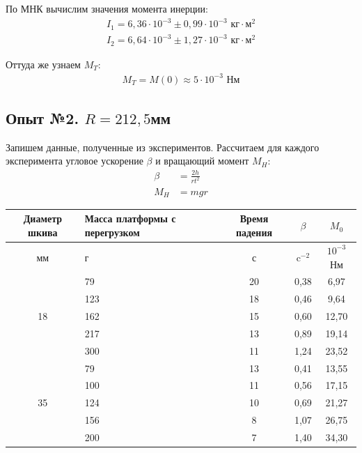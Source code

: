 \documentclass[a4paper, 12pt]{article}
\begin{document}
По МНК вычислим значения момента инерции:
\begin{align*}
I_1 = 6,36 \cdot 10^{-3} \pm 0,99 \cdot 10^{-3} \text{ кг$\cdot$м$^2$} \\
I_2 = 6,64 \cdot 10^{-3} \pm 1,27 \cdot 10^{-3} \text{ кг$\cdot$м$^2$}
\end{align*}

Оттуда же узнаем $M_T$:
\begin{align*}
M_T = M(0) \approx 5 \cdot 10^{-3} \text{ Нм}
\end{align*}

\subsection{Опыт №2. $R = 212,5$мм}

Запишем данные, полученные из экспериментов.
Рассчитаем для каждого эксперимента угловое ускорение $\beta$ и вращающий момент $M_H$:
\begin{align*}
\beta &= \frac{2h}{rt^2} \\
M_H &= mgr
\end{align*}

\begin{center}
\begin{tabular}{|c|p{4cm}|c|c|c|}
\hline
Диаметр шкива & Масса платформы с перегрузком & Время падения & $\beta$  & $M_0$       \\ \hline
мм            & г                             & с             & c$^{-2}$ & $10^{-3}$Нм \\ \hline
              & 79                            & 20            & 0,38     & 6,97        \\ \cline{2-5} 
              & 123                           & 18            & 0,46     & 9,64        \\ \cline{2-5} 
18            & 162                           & 15            & 0,60     & 12,70        \\ \cline{2-5} 
              & 217                           & 13            & 0,89     & 19,14       \\ \cline{2-5} 
              & 300                           & 11            & 1,24     & 23,52       \\ \hline \hline
              & 79                            & 13            & 0,41     & 13,55       \\ \cline{2-5} 
              & 100                           & 11            & 0,56     & 17,15       \\ \cline{2-5} 
35            & 124                           & 10            & 0,69     & 21,27       \\ \cline{2-5} 
              & 156                           & 8             & 1,07     & 26,75       \\ \cline{2-5} 
              & 200                           & 7             & 1,40     & 34,30       \\ \hline
\end{tabular}
\end{center}
\end{document}
